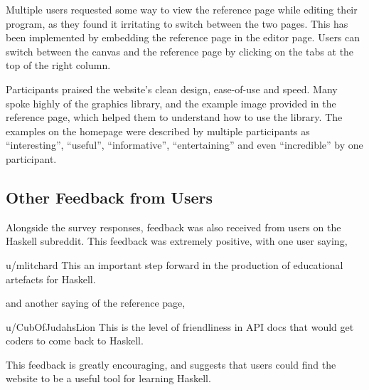 \documentclass[../main.tex]{subfiles}
\begin{document}
                Multiple users requested some way to view the reference page while editing
                    their program, as they found it irritating to switch between the two pages.
                This has been implemented by embedding the reference page in the editor page.
                Users can switch between the canvas and the reference page by clicking on the
                    tabs at the top of the right column.

                Participants praised the website's clean design, ease-of-use and speed.
                Many spoke highly of the graphics library, and the example image provided in
                    the reference page, which helped them to understand how to use the library.
                The examples on the homepage were described by multiple participants as
                    ``interesting'', ``useful'', ``informative'', ``entertaining'' and even
                    ``incredible'' by one participant.

        \subsection{Other Feedback from Users}

            Alongside the survey responses, feedback was also received from users on the
                Haskell subreddit.
            This feedback was extremely positive, with one user saying,
            \begin{aquote}{u/mlitchard}
                This an important step forward in the production of educational artefacts for
                    Haskell.
            \end{aquote}
            and another saying of the reference page,
            \begin{aquote}{u/CubOfJudahsLion}
                This is the level of friendliness in API docs that would get coders to come
                    back to Haskell.
            \end{aquote}
            This feedback is greatly encouraging, and suggests that users could find the
                website to be a useful tool for learning Haskell.
\end{document}
